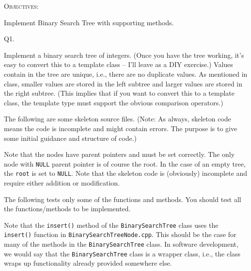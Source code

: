 


\renewcommand\TITLE{Assignment 10}

\usepackage{listings}
\lstset{%
basicstyle=\ttfamily, frame=single
}



\topmatter


\textsc{Objectives:}
\begin{myenum}
\item Implement Binary Search Tree with supporting methods.
\end{myenum}

\newpage
Q1.

Implement a binary search tree of integers. 
(Once you have the tree working, it's easy to convert this to a 
template class -- I'll leave as a DIY exercise.)
Values contain in the tree are unique, i.e., there are no duplicate values.
As mentioned in class,
smaller values are stored in the left subtree and larger values are
stored in the right subtree.
(This implies that if you want to convert this to a template class,
the template type must support the obvious comparison operators.)

The following are some skeleton source files.
(Note: As always, skeleton
code means the code is incomplete and might contain errors.
The purpose is to give some initial guidance and structure of code.)
 
Note that the nodes have parent pointers and must be set correctly.
The only node with \verb!NULL! parent pointer is of course the root.
In the case of an empty tree, the \verb!root! is set to \verb!NULL!.
Note that the skeleton code is (obviously) incomplete and require
either addition or modification.







The following tests only some of the functions and methods. 
You should test all the functions/methods to be implemented.


Note that the \verb!insert()! method of the 
\verb!BinarySearchTree! class uses the \verb!insert()! function in 
\verb!BinarySearchTreeNode.cpp!.
This should be the case for many of the methods in the \verb!BinarySearchTree!
class.
In software development, we would say that the \verb!BinarySearchTree!
class is a wrapper class, i.e., the class wraps up functionality already
provided somewhere else.

